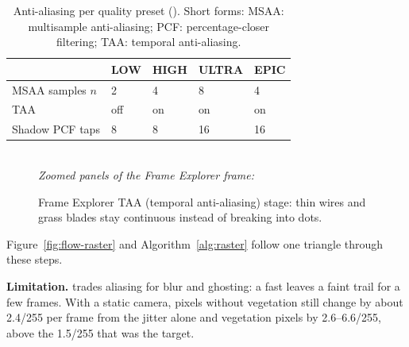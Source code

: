 \begin{table}[htbp]
\caption{Anti-aliasing per quality preset (). Short forms: MSAA: multisample anti-aliasing; PCF: percentage-closer filtering; TAA: temporal anti-aliasing.}\label{tab:aa}
\centering\small
\begin{tabular}{@{}lllll@{}}
\toprule
 & LOW & HIGH & ULTRA & EPIC\\\midrule
MSAA samples $n$ & 2 & 4 & 8 & 4\\
TAA & off & on & on & on\\
Shadow PCF taps & 8 & 8 & 16 & 16\\
\bottomrule
\end{tabular}
\end{table}

\begin{figure}[htbp]
\centering{}
\\[1mm]
{\footnotesize\textit{Zoomed panels of the Frame Explorer frame:}}\\[0.5mm]
\feStageTaaInfo\hfill\feStageTaaFormula
\caption{Frame Explorer TAA (temporal anti-aliasing) stage: thin wires and grass blades stay continuous instead of breaking into dots.}
\label{fig:taa}
\end{figure}

Figure~\ref{fig:flow-raster} and Algorithm~\ref{alg:raster} follow one triangle through these steps.
\flowRaster
\algRaster

\textbf{Limitation.}  trades aliasing for blur and ghosting: a fast  leaves a faint trail for a few frames. With
a static camera, pixels without vegetation still change by about 2.4/255 per frame from the jitter alone and vegetation
pixels by 2.6--6.6/255, above the 1.5/255 that was the target.
